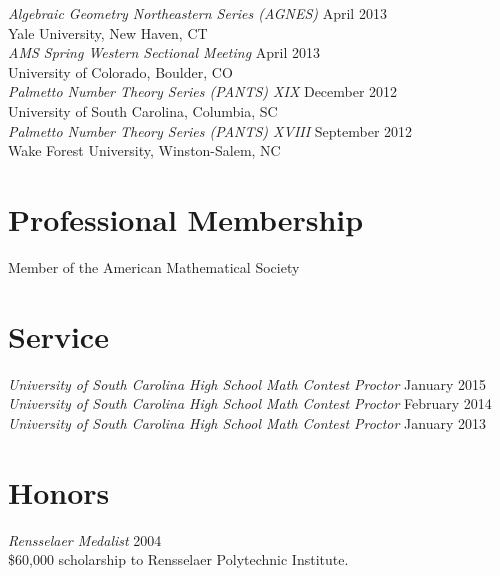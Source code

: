 \documentclass{article}
\begin{document}
\noindent\textsl{Algebraic Geometry Northeastern Series (AGNES)} \hfill April 2013\\
Yale University, New Haven, CT\\

\noindent\textsl{AMS Spring Western Sectional Meeting} \hfill April 2013\\
University of Colorado, Boulder, CO\\

\noindent\textsl{Palmetto Number Theory Series (PANTS) XIX} \hfill December 2012\\
University of South Carolina, Columbia, SC\\

\noindent\textsl{Palmetto Number Theory Series (PANTS) XVIII} \hfill September 2012\\
Wake Forest University, Winston-Salem, NC



\section*{Professional Membership}
Member of the American Mathematical Society

\section*{Service}
\textsl{University of South Carolina High School Math Contest Proctor} \hfill January 2015\\
\textsl{University of South Carolina High School Math Contest Proctor} \hfill February 2014\\
\textsl{University of South Carolina High School Math Contest Proctor} \hfill January 2013

\section*{Honors}
\textsl{Rensselaer Medalist} \hfill 2004\\
\$60,000 scholarship to Rensselaer Polytechnic Institute.\\
\end{document}
